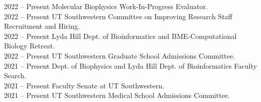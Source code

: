2022 -- Present \hspace{14pt} Molecular Biophysics Work-In-Progress Evaluator. \\
2022 -- Present \hspace{14pt} UT Southwestern Committee on Improving Research Staff Recruitment and Hiring. \\
2022 -- Present \hspace{14pt} Lyda Hill Dept. of Bioinformatics and BME-Computational Biology Retreat. \\
2022 -- Present \hspace{14pt} UT Southwestern Graduate School Admissions Committee. \\
2021 -- Present \hspace{14pt} Dept. of Biophysics and Lyda Hill Dept. of Bioinformatics Faculty Search. \\
2021 -- Present \hspace{14pt}  Faculty Senate at UT Southwestern.  \\
2021 -- Present \hspace{14pt}  UT Southwestern Medical School Admissions Committee.